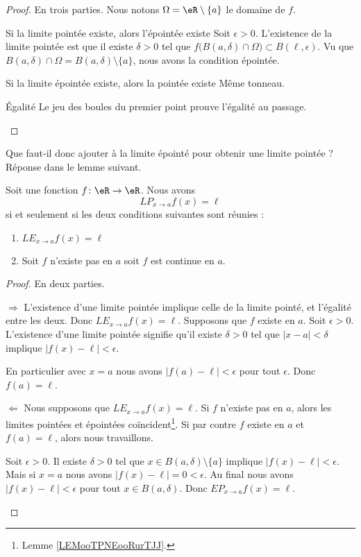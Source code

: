 \begin{proof}
    En trois parties. Nous notons \( \Omega=\eR\setminus\{ a \}\) le domaine de \( f\).
    \begin{subproof}
    \item[Si la limite pointée existe, alors l'épointée existe]
        Soit \( \epsilon>0\). L'existence de la limite pointée est que il existe \( \delta>0\) tel que \( f\big( B(a,\delta)\cap \Omega \big)\subset  B(\ell,\epsilon)\). Vu que \( B(a,\delta)\cap\Omega=B(a,\delta)\setminus\{ a \}\), nous avons la condition épointée.
    \item[Si la limite épointée existe, alors la pointée existe]
        Même tonneau.
    \item[Égalité]
        Le jeu des boules du premier point prouve l'égalité au passage.
    \end{subproof}
\end{proof}

Que faut-il donc ajouter à la limite épointé pour obtenir une limite pointée ? Réponse dans le lemme suivant.
\begin{lemma}
    Soit une fonction \( f\colon \eR\to \eR\). Nous avons
    \begin{equation}
        {LP}_{x\to a}f(x)=\ell
    \end{equation}
    si et seulement si les deux conditions suivantes sont réunies :
    \begin{enumerate}
        \item
    \( {LE}_{x\to a}f(x)=\ell\) 
\item
        Soit \( f\) n'existe pas en \( a\) soit \( f\) est continue en \( a\).
    \end{enumerate}
\end{lemma}

\begin{proof}
    En deux parties.
    \begin{subproof}
    \item[\( \Rightarrow\)]
        L'existence d'une limite pointée implique celle de la limite pointé, et l'égalité entre les deux. Donc \( {LE}_{x\to a}f(x)=\ell\). Supposons que \( f\) existe en \( a\). Soit \( \epsilon>0\). L'existence d'une limite pointée signifie qu'il existe \( \delta>0\) tel que \( | x-a |<\delta\) implique \( | f(x)-\ell |<\epsilon\).

        En particulier avec \( x=a\) nous avons \( | f(a)-\ell |<\epsilon\) pour tout \( \epsilon\). Donc \( f(a)=\ell\).
    \item[\( \Leftarrow\)]
        Nous supposons que \( {LE}_{x\to a}f(x)=\ell\). Si \( f\) n'existe pas en \( a\), alors les limites pointées et épointées coïncident\footnote{Lemme \ref{LEMooTPNEooRurTJJ}.}. Si par contre \( f\) existe en \( a\) et \( f(a)=\ell\), alors nous travaillons. 

        Soit \( \epsilon>0\). Il existe \( \delta>0\) tel que \(  x\in B(a,\delta)\setminus \{ a \}  \) implique \( | f(x)-\ell |<\epsilon\). Mais si \( x=a\) nous avons \( | f(x)-\ell |=0<\epsilon\). Au final nous avons \( | f(x)-\ell |<\epsilon\) pour tout \( x\in B(a,\delta)\). Donc \( {EP}_{x\to a}f(x)=\ell\).
    \end{subproof}
\end{proof}

